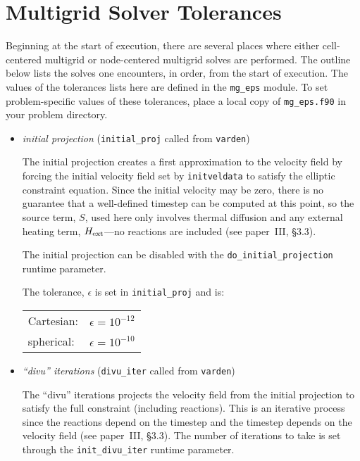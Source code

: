 \section{Multigrid Solver Tolerances}

Beginning at the start of execution, there are several places where
either cell-centered multigrid or node-centered multigrid solves are
performed.  The outline below lists the solves one encounters, in order,
from the start of execution.  The values of the tolerances lists here
are defined in the {\tt mg\_eps} module.  To set problem-specific values
of these tolerances, place a local copy of {\tt mg\_eps.f90} in your
problem directory.

\begin{itemize}

\item {\em initial projection} ({\tt initial\_proj} called from {\tt varden})

  The initial projection creates a first approximation to the velocity
  field by forcing the initial velocity field set by {\tt initveldata}
  to satisfy the elliptic constraint equation.  Since the initial
  velocity may be zero, there is no guarantee that a well-defined
  timestep can be computed at this point, so the source term, $S$,
  used here only involves thermal diffusion and any external heating
  term, ${H_{\rm ext}}$---no reactions are included (see paper~III, \S 3.3).

  The initial projection can be disabled with the {\tt do\_initial\_projection}
  runtime parameter.

  The tolerance, $\epsilon$ is set in {\tt initial\_proj} and is:
   \begin{center}
   \begin{tabular}{ll}
   Cartesian:   & $\epsilon = 10^{-12}$ \\
   spherical:   & $\epsilon = 10^{-10}$ \\
   \end{tabular}
   \end{center}


\item {\em ``divu'' iterations} ({\tt divu\_iter} called from {\tt varden})

  The ``divu'' iterations projects the velocity field from the initial
  projection to satisfy the full constraint (including reactions).
  This is an iterative process since the reactions depend on the
  timestep and the timestep depends on the velocity field (see
  paper~III, \S 3.3).  The number of iterations to take is set through
  the {\tt init\_divu\_iter} runtime parameter.


\end{itemize}
